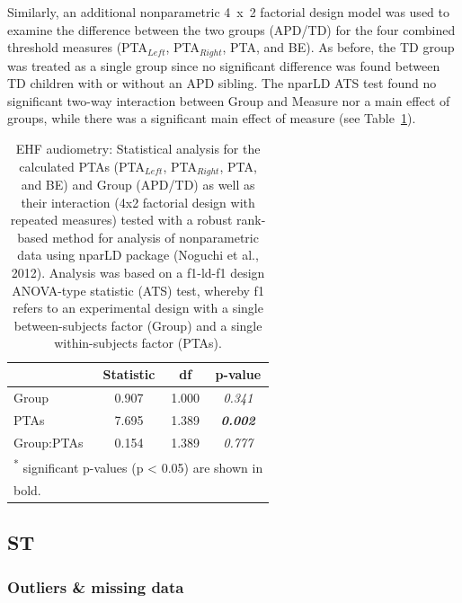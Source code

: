 \documentclass[a4paper, twoside]{templates/ociamthesis}
\begin{document}
Similarly, an additional nonparametric 4~x~2 factorial design model was used to examine the difference between the two groups (APD/TD) for the four combined threshold measures (PTA\(_{Left}\), PTA\(_{Right}\), PTA, and BE). As before, the TD group was treated as a single group since no significant difference was found between TD children with or without an APD sibling. The nparLD ATS test found no significant two-way interaction between Group and Measure nor a main effect of groups, while there was a significant main effect of measure (see Table~\ref{tab:EHF-PTATabnparLD}).\\

\begin{table}

\caption{\label{tab:EHF-PTATabnparLD}EHF audiometry: Statistical analysis for the calculated PTAs (PTA$_{Left}$, PTA$_{Right}$, PTA, and BE) and Group (APD/TD) as well as their interaction (4x2 factorial design with repeated measures) tested with a robust rank-based method for analysis of nonparametric data using nparLD package (Noguchi et al., 2012). Analysis was based on a f1-ld-f1 design ANOVA-type statistic (ATS) test, whereby f1 refers to an experimental design with a single between-subjects factor (Group) and a single within-subjects factor (PTAs).}
\centering
\begin{tabular}[t]{lcc>{}c}
\toprule
  & Statistic & df & p-value\\
\midrule
Group & 0.907 & 1.000 & \em{0.341}\\
PTAs & 7.695 & 1.389 & \em{\textbf{0.002}}\\
Group:PTAs & 0.154 & 1.389 & \em{0.777}\\
\bottomrule
\multicolumn{4}{l}{\textsuperscript{*} significant p-values (p < 0.05) are shown in}\\
\multicolumn{4}{l}{bold.}\\
\end{tabular}
\end{table}

\hypertarget{st}{%
\subsection{ST}\label{st}}

\hypertarget{outliers-missing-data}{%
\subsubsection*{Outliers \& missing data}\label{outliers-missing-data}}
\end{document}
